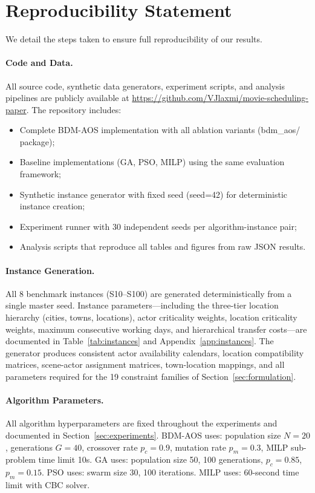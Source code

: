 \section*{Reproducibility Statement}
\label{sec:reproducibility}

We detail the steps taken to ensure full reproducibility of our results.

\paragraph{Code and Data.}
All source code, synthetic data generators, experiment scripts, and analysis pipelines are publicly available at \url{https://github.com/VJlaxmi/movie-scheduling-paper}.
The repository includes:
\begin{itemize}
    \item Complete BDM-AOS implementation with all ablation variants ({\ttfamily bdm\_aos/} package);
    \item Baseline implementations (GA, PSO, MILP) using the same evaluation framework;
    \item Synthetic instance generator with fixed seed ({\ttfamily seed=42}) for deterministic instance creation;
    \item Experiment runner with 30 independent seeds per algorithm-instance pair;
    \item Analysis scripts that reproduce all tables and figures from raw JSON results.
\end{itemize}

\paragraph{Instance Generation.}
All 8 benchmark instances (S10--S100) are generated deterministically from a single master seed.
Instance parameters---including the three-tier location hierarchy (cities, towns, locations), actor criticality weights, location criticality weights, maximum consecutive working days, and hierarchical transfer costs---are documented in Table~\ref{tab:instances} and Appendix~\ref{app:instances}.
The generator produces consistent actor availability calendars, location compatibility matrices, scene-actor assignment matrices, town-location mappings, and all parameters required for the 19 constraint families of Section~\ref{sec:formulation}.

\paragraph{Algorithm Parameters.}
All algorithm hyperparameters are fixed throughout the experiments and documented in Section~\ref{sec:experiments}.
BDM-AOS uses: population size $N=20$, generations $G=40$, crossover rate $p_c=0.9$, mutation rate $p_m=0.3$, MILP sub-problem time limit 10s.
GA uses: population size 50, 100 generations, $p_c=0.85$, $p_m=0.15$.
PSO uses: swarm size 30, 100 iterations.
MILP uses: 60-second time limit with CBC solver.

